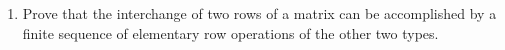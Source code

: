 \renewcommand{\theequation}{\theenumi}
\renewcommand{\thefigure}{\theenumi}
\begin{enumerate}[label=\thesection.\arabic*.,ref=\thesection.\theenumi]
%
\item Prove that the interchange of two rows of a matrix can be accomplished by a finite sequence of elementary row operations of the other two types.
\\
\solution

\end{enumerate}


